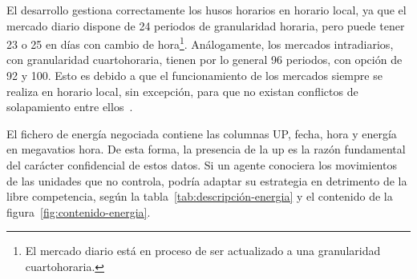 El desarrollo gestiona correctamente los husos horarios en horario local, ya que el mercado diario dispone de 24 periodos de granularidad horaria, pero puede tener 23 o 25 en días con cambio de hora\footnote{El mercado diario está en proceso de ser actualizado a una granularidad cuartohoraria.}. Análogamente, los mercados intradiarios, con granularidad cuartohoraria, tienen por lo general 96 periodos, con opción de 92 y 100. Esto es debido a que el funcionamiento de los mercados siempre se realiza en horario local, sin excepción, para que no existan conflictos de solapamiento entre ellos~\cite{omie2025reglas}.

El fichero de energía negociada contiene las columnas UP, fecha, hora y energía en megavatios hora. De esta forma, la presencia de la \gls{up} es la razón fundamental del carácter confidencial de estos datos. Si un agente conociera los movimientos de las unidades que no controla, podría adaptar su estrategia en detrimento de la libre competencia, según la tabla~\ref{tab:descripción-energia} y el contenido de la figura~\ref{fig:contenido-energia}.

